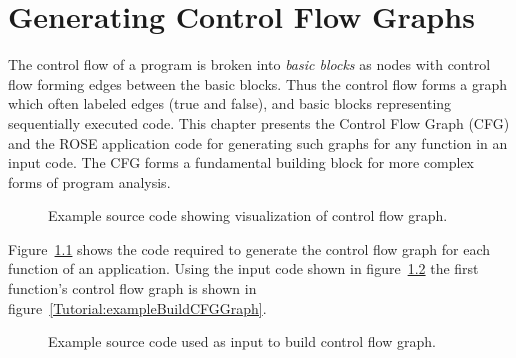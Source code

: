 \chapter{Generating Control Flow Graphs}

   The control flow of a program is broken into {\em basic blocks}
as nodes with control flow forming edges between the basic blocks.
Thus the control flow forms a graph which often labeled edges (true 
and false), and basic blocks representing sequentially executed code.
This chapter presents the Control Flow Graph (CFG) and the ROSE 
application code for generating such graphs for any function in an 
input code.  The CFG forms a fundamental building block for more 
complex forms of program analysis.

\begin{figure}[!h]
{\indent
{\mySmallFontSize


\begin{latexonly}
   
\end{latexonly}

\begin{htmlonly}
   
\end{htmlonly}

}
}
\caption{Example source code showing visualization of control flow graph.}
\label{Tutorial:exampleBuildCFG}
\end{figure}

   Figure~\ref{Tutorial:exampleBuildCFG} shows the code required to generate
the control flow graph for each function of an application.  Using the input code shown in
figure~\ref{Tutorial:exampleInputCode_BuildCFG} the first function's control flow graph is
shown in figure~\ref{Tutorial:exampleBuildCFGGraph}.

\begin{figure}[!h]
{\indent
{\mySmallFontSize


\begin{latexonly}
   
\end{latexonly}

\begin{htmlonly}
   
\end{htmlonly}

}
}
\caption{Example source code used as input to build control flow graph.}
\label{Tutorial:exampleInputCode_BuildCFG}
\end{figure}


